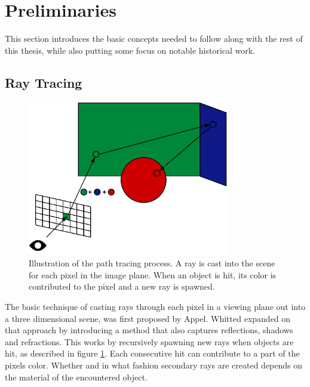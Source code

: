 \section{Preliminaries}
This section introduces the basic concepts needed to follow along with the rest of this thesis, while also putting some focus on notable historical work.
\subsection{Ray Tracing}
\label{path_tracing_basics}
\begin{figure}[H]
    \centering
    \includegraphics[width=250pt]{images/ray_tracing.pdf}
    \caption{Illustration of the path tracing process. A ray is cast into the scene for each pixel in the image plane. When an object is hit, its color is contributed to the pixel and a new ray is spawned.}
    \label{fig:path_trace}
\end{figure}
The basic technique of casting rays through each pixel in a viewing plane out into a three dimensional scene, was first proposed by Appel\cite{appel1968}. Whitted\cite{whitted_improved_1980} expanded on that approach by introducing a method that also captures reflections, shadows and refractions. This works by recursively spawning new rays when objects are hit, as described in figure \ref{fig:path_trace}. Each consecutive hit can contribute to a part of the pixels color. Whether and in what fashion secondary rays are created depends on the material of the encountered object. 

